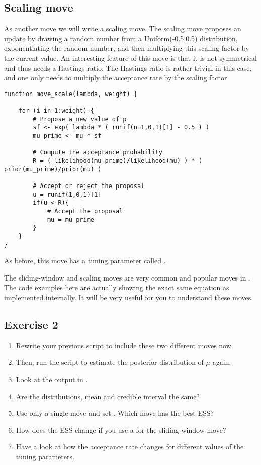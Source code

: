 \subsection{Scaling move}
As another move we will write a scaling move.
The scaling move proposes an update by drawing a random number from a Uniform(-0.5,0.5) distribution, exponentiating the random number, and then multiplying this scaling factor by the current value.
An interesting feature of this move is that it is not symmetrical and thus needs a Hastings ratio.
The Hastings ratio is rather trivial in this case, and one only needs to multiply the acceptance rate by the scaling factor.
{\tt \begin{snugshade*}
\begin{lstlisting}    
function move_scale(lambda, weight) {

    for (i in 1:weight) {
        # Propose a new value of p
        sf <- exp( lambda * ( runif(n=1,0,1)[1] - 0.5 ) )
        mu_prime <- mu * sf

        # Compute the acceptance probability
        R = ( likelihood(mu_prime)/likelihood(mu) ) * ( prior(mu_prime)/prior(mu) ) 

        # Accept or reject the proposal
        u = runif(1,0,1)[1] 
        if(u < R){
            # Accept the proposal
            mu = mu_prime 
        }
    }
}
\end{lstlisting}
\end{snugshade*}}
As before, this move has a tuning parameter called .

\begin{framed}
\IMPORANT The sliding-window and scaling moves are very common and popular moves in \RevBayes.
The code examples here are actually showing the exact same equation as implemented internally.
It will be very useful for you to understand these moves.	
\end{framed}


\subsection{Exercise 2}

\begin{enumerate}[label=\textnormal{Step \arabic*)},leftmargin=1.5cm]
	\item Rewrite your previous script to include these two different moves now.
	\item Then, run the script to estimate the posterior distribution of $\mu$ again.
	\item Look at the output in \Tracer.
	\item Are the distributions, mean and credible interval the same?
	\item Use only a single move and set . Which move has the best ESS?
	\item How does the ESS change if you use a  for the sliding-window move?
	\item Have a look at how the acceptance rate changes for different values of the tuning parameters.
\end{enumerate}


